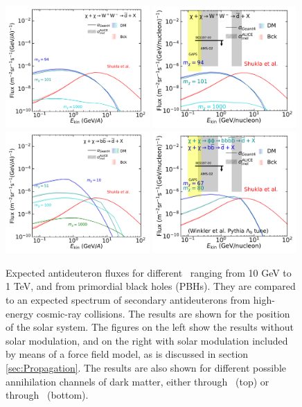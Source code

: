 \begin{figure}
    \centering
    \includegraphics[width=0.49\textwidth]{figures/antideuteron_LIS_WW.pdf}
    \includegraphics[width=0.49\textwidth]{figures/antideuteron_TOA_WW.pdf}
    \includegraphics[width=0.49\textwidth]{figures/antideuteron_LIS_bb.pdf}
    \includegraphics[width=0.49\textwidth]{figures/antideuteron_lambdaB_TOA.pdf}
    \caption{Expected antideuteron fluxes for different \dmm\ ranging from 10 GeV to 1 TeV, and from primordial black holes (PBHs). They are compared to an expected spectrum of secondary antideuterons from high-energy cosmic-ray collisions. The results are shown for the position of the solar system. The figures on the left show the results without solar modulation, and on the right with solar modulation included by means of a force field model, as is discussed in section \ref{sec:Propagation}. The results are also shown for different possible annihilation channels of dark matter, either through \WW\ (top) or through \bb\ (bottom).}
    \label{fig:Results_dbar_fluxes_diff_DM_masses}
\end{figure}
